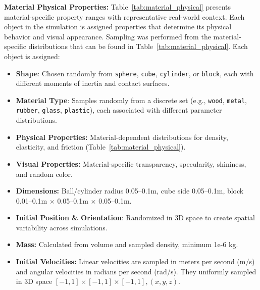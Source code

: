 \documentclass[conference]{IEEEtran}
\begin{document}


\noindent\textbf{Material Physical Properties:}
Table~\ref{tab:material_physical} presents material-specific property ranges with representative real-world context.
Each object in the simulation is assigned properties that determine its physical behavior and visual appearance. Sampling was performed from the material-specific distributions that can be found in  Table~\ref{tab:material_physical}.  Each object is assigned:
\begin{itemize}
    \item \textbf{Shape}: Chosen randomly from \texttt{sphere}, \texttt{cube}, \texttt{cylinder}, or \texttt{block}, each with different moments of inertia and contact surfaces.
    \item \textbf{Material Type}: Samples randomly from a discrete set (e.g., \texttt{wood}, \texttt{metal}, \texttt{rubber}, \texttt{glass}, \texttt{plastic}), each associated with different parameter distributions.
    \item \textbf{Physical Properties:} Material-dependent distributions for density, elasticity, and friction (Table~\ref{tab:material_physical}).
    \item \textbf{Visual Properties:} Material-specific transparency, specularity, shininess, and random color.
    \item \textbf{Dimensions:} Ball/cylinder radius 0.05--0.1m, cube side 0.05--0.1m, block 0.01--0.1m $\times$ 0.05--0.1m $\times$ 0.05--0.1m.
    \item \textbf{Initial Position \& Orientation}: Randomized in 3D space to create spatial variability across simulations.
    \item \textbf{Mass:} Calculated from volume and sampled density, minimum 1e-6 kg.
    \item \textbf{Initial Velocities:} Linear velocities are sampled in meters per second (m/s) and angular velocities in radians per second (rad/s). They uniformly sampled in 3D space $[-1,1] \times [-1,1] \times [-1,1], (x,y,z)$.
\end{itemize}
\end{document}
